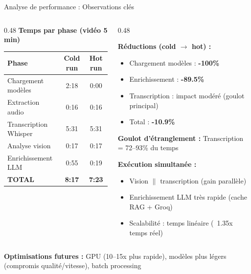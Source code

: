 \documentclass[10pt,aspectratio=169]{beamer}
\begin{document}
\begin{frame}{Analyse de performance : Observations clés}
\begin{columns}[T]
\begin{column}{0.48\textwidth}
\textbf{Temps par phase (vidéo 5 min)}
\vspace{0.1cm}
\begin{tabular}{lcc}
\rowcolor{primary!20}\textbf{Phase} & \textbf{Cold run} & \textbf{Hot run} \\
\hline
Chargement modèles & 2:18 & 0:00 \\
Extraction audio & 0:16 & 0:16 \\
Transcription Whisper & 5:31 & 5:31 \\
Analyse vision & 0:17 & 0:17 \\
Enrichissement LLM & 0:55 & 0:19 \\
\rowcolor{accent!20}\textbf{TOTAL} & \textbf{8:17} & \textbf{7:23} \\
\hline
\end{tabular}
\end{column}
\begin{column}{0.48\textwidth}
\begin{tcolorbox}[title=Impact du cache, colframe=success, colback=success!3]
\small
\textbf{Réductions (cold $\rightarrow$ hot) :}
\begin{itemize}
    \item Chargement modèles : \textbf{-100\%}
    \item Enrichissement : \textbf{-89.5\%}
    \item Transcription : impact modéré (goulot principal)
    \item Total : \textbf{-10.9\%}
\end{itemize}
\textbf{Goulot d'étranglement :} Transcription = 72--93\% du temps
\end{tcolorbox}
\vspace{0.2cm}
\begin{tcolorbox}[title=Parallélisme, colframe=primary, colback=primary!3]
\small
\textbf{Exécution simultanée :}
\begin{itemize}
    \item Vision $\parallel$ transcription (gain parallèle)
    \item Enrichissement LLM très rapide (cache RAG + Groq)
    \item Scalabilité : temps linéaire (~1.35x temps réel)
\end{itemize}
\end{tcolorbox}
\end{column}
\end{columns}
\vspace{0.2cm}
\begin{tcolorbox}[colback=secondary!45,colframe=primary!25]
\small \textbf{Optimisations futures :} GPU (10--15x plus rapide), modèles plus légers (compromis qualité/vitesse), batch processing
\end{tcolorbox}
\end{frame}
\end{document}
